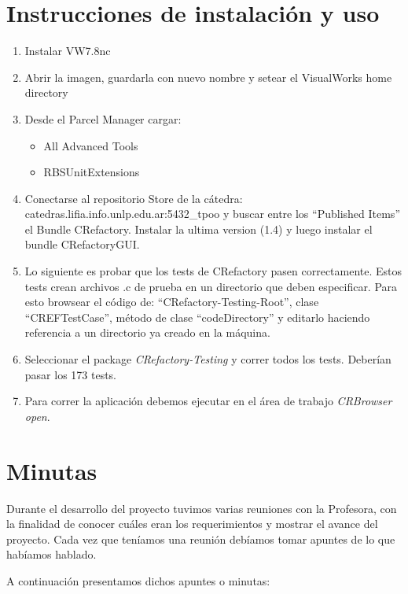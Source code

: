 \documentclass[a4paper,oneside,12pt]{article}
\begin{document}
\section{Instrucciones de instalaci\'on y uso}

\begin{enumerate}
\item Instalar VW7.8nc
\item Abrir la imagen, guardarla con nuevo nombre y setear el VisualWorks home directory

\item Desde el Parcel Manager cargar:
  \begin{itemize}
  \item All Advanced Tools
  \item RBSUnitExtensions
  \end{itemize}
  
\item Conectarse al repositorio Store de la c\'atedra: catedras.lifia.info.unlp.edu.ar:5432\_tpoo y buscar entre los “Published Items” el Bundle CRefactory. Instalar la ultima version (1.4) y luego instalar el bundle CRefactoryGUI.

\item Lo siguiente es probar que los tests de CRefactory pasen correctamente. Estos tests crean archivos .c de prueba en un directorio que deben especificar. Para esto browsear el c\'odigo de: “CRefactory-Testing-Root”, clase “CREFTestCase”, m\'etodo de clase “codeDirectory” y editarlo haciendo referencia a un directorio ya creado en la m\'aquina.
  
\item Seleccionar el package {\it CRefactory-Testing} y correr todos los tests. Deber\'ian pasar los 173 tests.

\item Para correr la aplicaci\'on debemos ejecutar en el \'area de trabajo  {\it CRBrowser open}. 
\end{enumerate}

\section{Minutas}
\label{sec:minutas}
Durante el desarrollo del proyecto tuvimos varias reuniones con la Profesora, con la finalidad de conocer cu\'ales eran los requerimientos y mostrar el avance del proyecto. Cada vez que ten\'iamos una reuni\'on deb\'iamos tomar apuntes de lo que hab\'iamos hablado.

A continuaci\'on presentamos dichos apuntes o minutas:
\end{document}
